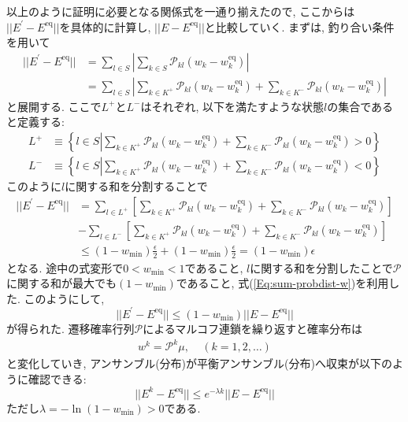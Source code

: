 以上のように証明に必要となる関係式を一通り揃えたので, ここからは$|| E^{\prime} - E^{\mathrm{eq}}||$を具体的に計算し, $|| E- E^{\mathrm{eq}}||$と比較していく.
まずは, 釣り合い条件を用いて
\begin{align}
    || E^{\prime} - E^{\mathrm{eq}}||
    &=
    \sum_{l \in S}
    \left| \sum_{k \in S} \mathcal{P}_{kl} (w_{k} - w_{k}^{\mathrm{eq}}) \right| \\
    &=
    \sum_{l \in S}
    \left|
          \sum_{k \in K^{+}} \mathcal{P}_{kl} (w_{k} - w_{k}^{\mathrm{eq}})
        + \sum_{k \in K^{-}} \mathcal{P}_{kl} (w_{k} - w_{k}^{\mathrm{eq}})
    \right|
\end{align}
と展開する.
ここで$L^{+}$と$L^{-}$はそれぞれ, 以下を満たすような状態$l$の集合であると定義する:
\begin{align}
    L^{+}
    &\equiv
    \left\{
        l \in S
        \left|
        \sum_{k \in K^{+}} \mathcal{P}_{kl} (w_{k} - w_{k}^{\mathrm{eq}})
      + \sum_{k \in K^{-}} \mathcal{P}_{kl} (w_{k} - w_{k}^{\mathrm{eq}}) > 0
    \right\} \right.
    \\
    L^{-}
    &\equiv
    \left\{
        l \in S
        \left|
        \sum_{k \in K^{+}} \mathcal{P}_{kl} (w_{k} - w_{k}^{\mathrm{eq}})
      + \sum_{k \in K^{-}} \mathcal{P}_{kl} (w_{k} - w_{k}^{\mathrm{eq}}) < 0
    \right\} \right.
\end{align}
このように$l$に関する和を分割することで
\begin{align}
    || E^{\prime} - E^{\mathrm{eq}}||
    &=
    \sum_{l \in L^{+}}
    \left[
          \sum_{k \in K^{+}} \mathcal{P}_{kl} (w_{k} - w_{k}^{\mathrm{eq}})
        + \sum_{k \in K^{-}} \mathcal{P}_{kl} (w_{k} - w_{k}^{\mathrm{eq}})
    \right]
    \\
    &-
    \sum_{l \in L^{-}}
    \left[
          \sum_{k \in K^{+}} \mathcal{P}_{kl} (w_{k} - w_{k}^{\mathrm{eq}})
        + \sum_{k \in K^{-}} \mathcal{P}_{kl} (w_{k} - w_{k}^{\mathrm{eq}})
    \right]
    \\
    &\le
    (1 - w_{\min}) \frac{\epsilon}{2} + (1 - w_{\min}) \frac{\epsilon}{2}
    =
    (1 - w_{\min})\epsilon
\end{align}
となる. 途中の式変形で$0 < w_{\min} < 1$であること, $l$に関する和を分割したことで$\mathcal{P}$に関する和が最大でも$(1 - w_{\min})$であること, 式(\ref{Eq:sum-probdist-w})を利用した.
このようにして,
\begin{equation}
    || E^{\prime} - E^{\mathrm{eq}} ||
    \le
    (1 - w_{\min}) || E - E^{\mathrm{eq}} ||
\end{equation}
が得られた.
遷移確率行列$\mathcal{P}$によるマルコフ連鎖を繰り返すと確率分布は
\begin{eqnarray}
    w^{k} = \mathcal{P}^{k} \mu,~~~~~(k=1,2,\ldots)
\end{eqnarray}
と変化していき, アンサンブル(分布)が平衡アンサンブル(分布)へ収束が以下のように確認できる:
\begin{equation}
    || E^{k} - E^{\mathrm{eq}} ||
    \le
    e^{-\lambda k} || E - E^{\mathrm{eq}} ||
\end{equation}
ただし$\lambda = - \ln(1-w_{\min}) > 0$である.


